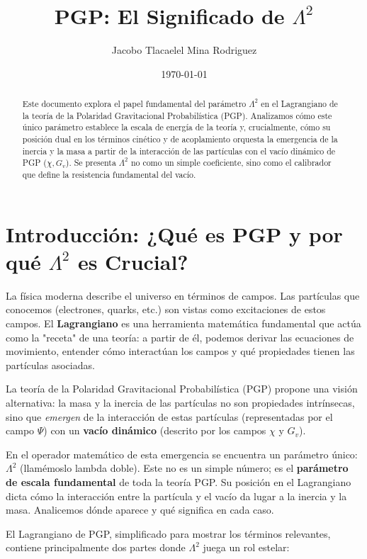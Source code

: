 \documentclass{article}
\title{PGP: El Significado de $\Lambda^2$}
\author{Jacobo Tlacaelel Mina Rodriguez}
\date{\today}
\begin{document}
\maketitle

\begin{abstract}
Este documento explora el papel fundamental del parámetro $\Lambda^2$ en el Lagrangiano de la teoría de la Polaridad Gravitacional Probabilística (PGP). Analizamos cómo este único parámetro establece la escala de energía de la teoría y, crucialmente, cómo su posición dual en los términos cinético y de acoplamiento orquesta la emergencia de la inercia y la masa a partir de la interacción de las partículas con el vacío dinámico de PGP ($\chi, G_v$). Se presenta $\Lambda^2$ no como un simple coeficiente, sino como el calibrador que define la resistencia fundamental del vacío.
\end{abstract}

\section{Introducción: ¿Qué es PGP y por qué $\Lambda^2$ es Crucial?}

La física moderna describe el universo en términos de campos. Las partículas que conocemos (electrones, quarks, etc.) son vistas como excitaciones de estos campos. El \textbf{Lagrangiano} es una herramienta matemática fundamental que actúa como la "receta" de una teoría: a partir de él, podemos derivar las ecuaciones de movimiento, entender cómo interactúan los campos y qué propiedades tienen las partículas asociadas.

La teoría de la Polaridad Gravitacional Probabilística (PGP) propone una visión alternativa: la masa y la inercia de las partículas no son propiedades intrínsecas, sino que \emph{emergen} de la interacción de estas partículas (representadas por el campo $\Psi$) con un \textbf{vacío dinámico} (descrito por los campos $\chi$ y $G_v$).

En el operador matemático de esta emergencia se encuentra un parámetro único: $\Lambda^2$ (llamémoslo lambda doble). Este no es un simple número; es el \textbf{parámetro de escala fundamental} de toda la teoría PGP. Su posición en el Lagrangiano dicta cómo la interacción entre la partícula y el vacío da lugar a la inercia y la masa. Analicemos dónde aparece y qué significa en cada caso.

El Lagrangiano de PGP, simplificado para mostrar los términos relevantes, contiene principalmente dos partes donde $\Lambda^2$ juega un rol estelar:
\end{document}
